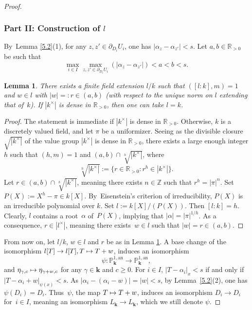 \documentclass[JEP,XML,SOM,Unicode,NoFloatCountersInSection,published]{cedram}
\newcommand{\mto}{\mathchoice{\longmapsto}{\mapsto}{\mapsto}{\mapsto}}
\newcommand{\bbk}{{\boldsymbol{k}}}%
\newtheorem{lm}[thm]{Lemma}
\theoremstyle{definition}
\begin{document}
\begin{proof}
\subsubsection*{Part II: Construction of $l$}
By~Lemma \ref{5.2}(1), for any $z, z' \in \partial_{D_{i}}{U_{i}}$, one has \hbox{$|\alpha_z-\alpha_{z'}| <s$}.
Let $a,b \in \mathbb{R}_{>0}$ be such that
\[
\max_{i \in I}\max_{z,z' \in \partial_{D_{i}}{U_{i}}}(|\alpha_z-\alpha_{z'}|) <a<b <s.
\]

\begin{lm} \label{extensions}
There exists a finite field extension $l/k$ such that $([l:k], m)=1$ and $ w \in l$ with $|w|=:r \in (a,b)$ (with respect to the unique norm on $l$ extending that of~$k$).
If $|k^{\times}|$ is dense in $\mathbb{R}_{>0}$, then one can take $l=k$.
\end{lm}

\begin{proof}
The statement is immediate if $|k^{\times}|$ is dense in $\mathbb{R}_{>0}$. Otherwise, $k$ is a discretely valued field, and let $\pi$ be a uniformizer. Seeing as the divisible closure $\sqrt{|k^{\times}|}$ of the value group $|k^{\times}|$ is dense in $\mathbb{R}_{>0}$, there exists a large enough integer $h$ such that $(h, m)=1$ and $(a,b) \cap \sqrt[h]{|k^{\times}|}$, where
\[
\sqrt[h]{|k^{\times}|}:=\{r \in \mathbb{R}_{>0}: r^h \in |k^{\times}|\}.
\]
Let $r \in (a,b) \cap \sqrt[h]{|k^{\times}|}$, meaning there exists $n \in \mathbb{Z}$ such that $r^h=|\pi|^n$.
Set $P(X):=X^h-\pi \in k[X]$. By~Eisenstein's criterion of irreducibility, $P(X)$ is an irreducible polynomial over $k$. Set $l\!:=\!k[X]/(P(X))$. Then $[l:k]\!=\!h$. Clearly, $l$ contains a root~$\alpha$ of~$P(X)$, implying that $|\alpha|=|\pi|^{1/h}$. As a consequence, $r \in |l^{\times}|$, meaning there exists~\hbox{$w \in l$} such that $|w|=r \in (a,b)$.
\end{proof}

From now on, let $l/k$, $w \in l$ and $r$ be as in Lemma \ref{extensions}. A base change of the isomorphism $l[T] \to l[T], T \mto T+w$, induces an isomorphism
\[
\psi: \mathbb{P}_{\bbk}^{1, \mathrm{an}} \to \mathbb{P}_{\bbk}^{1, \mathrm{an}},
\]
and $\eta_{\gamma, c} \mto \eta_{\gamma+w, c}$ for any $\gamma \in \bbk$ and $c \geqslant 0$. For $i \in I$, $|T-\alpha_i|_x<{s}$ if and only if $|T-\alpha_i+w|_{\psi(x)}<{s}$. As $|\alpha_i-(\alpha_i-w)|=|w|<s$, by Lemma~\ref{5.2}(2), one has $\psi(D_i)=D_i$. Thus~$\psi$, \ie the map $T \mto T+w$, induces an isomorphism $D_i \to D_i$ for~\hbox{$i \in I$}, meaning an isomorphism $L_{\bbk} \to L_{\bbk}$, which we still denote $\psi$.


\end{proof}
\end{document}
